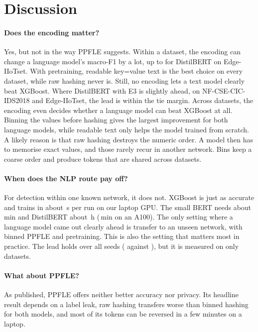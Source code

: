 \section{Discussion}\label{sec:discussion}
\paragraph{Does the encoding matter?} Yes, but not in the way PPFLE suggests. Within a dataset, the encoding can
change a language model's macro-F1 by a lot, up to
 for
DistilBERT on Edge-IIoTset. With pretraining, readable key=value text is the best choice on every dataset, while raw
hashing never is. Still, no encoding lets a text model clearly beat XGBoost. Where DistilBERT with E3 is slightly
ahead, on NF-CSE-CIC-IDS2018 and Edge-IIoTset, the lead is within the tie margin. Across datasets, the encoding even
decides whether a language model can beat XGBoost at all. Binning the values before hashing gives the largest
improvement for both language models, while readable text only helps the model trained from scratch. A likely reason is that raw hashing
destroys the numeric order. A model then has to memorise exact values, and those rarely recur in another network. Bins
keep a coarse order and produce tokens that are shared across datasets.

\paragraph{When does the NLP route pay off?} For detection within one known network, it does not. XGBoost is just as
accurate and trains in about \,s per run on our laptop GPU. The small BERT needs
about \,min and DistilBERT about \,h (\,min
on an A100). The
only setting where a language model came out clearly ahead is transfer to an unseen network, with binned PPFLE and
pretraining. This is also the setting that matters most in practice. The lead holds over all  seeds
( against ), but it is measured
on only  datasets.

\paragraph{What about PPFLE?} As published, PPFLE offers neither better accuracy nor privacy. Its headline result
depends on a label leak, raw hashing transfers worse than binned hashing for both models, and most of its tokens can be reversed in a few
minutes on a laptop.
